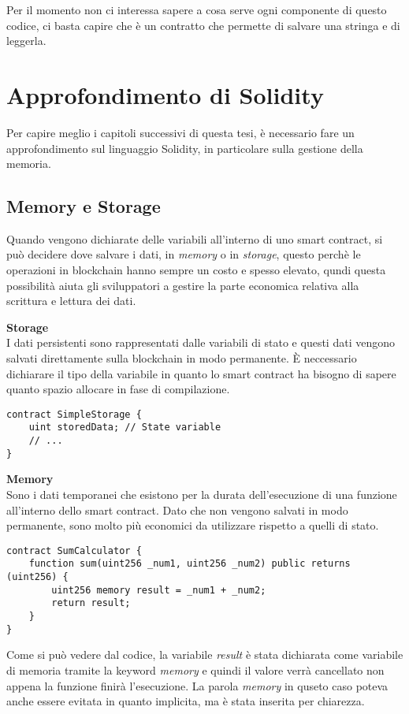 Per il momento non ci interessa sapere a cosa serve ogni componente di questo 
codice, ci basta capire che è un contratto che permette di salvare una stringa
e di leggerla. 

\section{Approfondimento di Solidity}
Per capire meglio i capitoli successivi di questa tesi, è necessario fare un
approfondimento sul linguaggio Solidity, in particolare sulla gestione della 
memoria.

\subsection{Memory e Storage}
Quando vengono dichiarate delle variabili all'interno di uno smart contract, si
può decidere dove salvare i dati, in \textit{memory} o in \textit{storage}, 
questo perchè le operazioni in blockchain hanno sempre un costo e spesso elevato,
qundi questa possibilità aiuta gli sviluppatori a gestire la parte economica
relativa alla scrittura e lettura dei dati. 

\textbf{Storage} \\
I dati persistenti sono rappresentati dalle variabili di stato e questi dati
vengono salvati direttamente sulla blockchain in modo permanente. È neccessario
dichiarare il tipo della variabile in quanto lo smart contract ha bisogno
di sapere quanto spazio allocare in fase di compilazione.
\begin{lstlisting}[language=Solidity]
contract SimpleStorage {
    uint storedData; // State variable
    // ...
}
\end{lstlisting}

\textbf{Memory} \\
Sono i dati temporanei che esistono per la durata dell'esecuzione di una
funzione all'interno dello smart contract. Dato che non vengono salvati in modo
permanente, sono molto più economici da utilizzare rispetto a quelli di stato.

\begin{lstlisting}[language=Solidity]
contract SumCalculator {
    function sum(uint256 _num1, uint256 _num2) public returns (uint256) {
        uint256 memory result = _num1 + _num2;
        return result;
    }
}
\end{lstlisting}

Come si può vedere dal codice, la variabile \textit{result} è stata dichiarata
come variabile di memoria tramite la keyword \textit{memory} e quindi il valore
verrà cancellato non appena la funzione finirà l'esecuzione. 
La parola \textit{memory} in quseto caso poteva anche essere evitata in quanto 
implicita, ma è stata inserita per chiarezza. 

